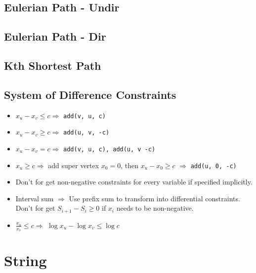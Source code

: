 \documentclass[a4paper,10pt,twocolumn,oneside]{article}
\begin{document}
\subsection{Eulerian Path - Undir}


\subsection{Eulerian Path - Dir}


%

\subsection{Kth Shortest Path}


\subsection{System of Difference Constraints}

\begin{itemize}
	\item $x_u - x_v \le c \Rightarrow$ \texttt{add(v, u, c)}
	\item $x_u - x_v \ge c \Rightarrow$ \texttt{add(u, v, -c)}
	\item $x_u - x_v = c \Rightarrow$ \texttt{add(v, u, c), add(u, v -c)}
	\item $x_u \ge c \Rightarrow$ add super vertex $x_0 = 0$, then $x_u - x_0 \ge c$ $\Rightarrow$ \texttt{add(u, 0, -c)}
	\item Don't for get non-negative constraints for every variable if specified implicitly.
	\item Interval sum $\Rightarrow$ Use prefix sum to transform into differential constraints.  Don't for get $S_{i+1} - S_{i} \ge 0$ if $x_i$ needs to be non-negative.
	\item $\frac{x_u}{x_v} \le c \Rightarrow$ $\log{x_u} - \log{x_v} \le \log{c}$
\end{itemize}





\section{String}
\end{document}

